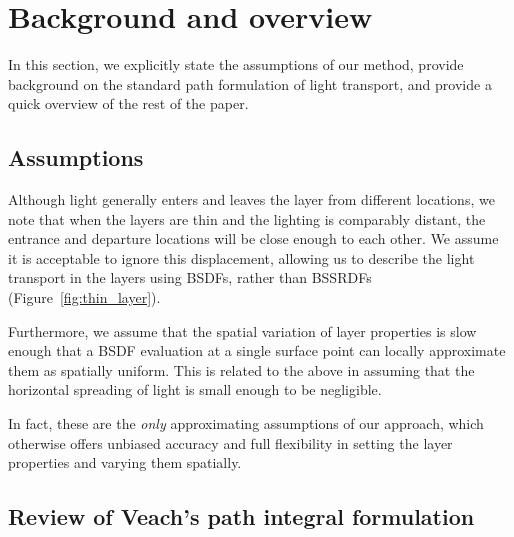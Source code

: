 \section{Background and overview}
\label{sec:background}





In this section, we explicitly state the assumptions of our method, provide background on the standard path formulation of light transport, and provide a quick overview of the rest of the paper.

\subsection{Assumptions}

Although light generally enters and leaves the layer from different locations, we note that when the layers are thin and the lighting is comparably distant, the entrance and departure locations will be close enough to each other. We assume it is acceptable to ignore this displacement, allowing us to describe the light transport in the layers using BSDFs, rather than BSSRDFs (Figure~\ref{fig:thin_layer}).

Furthermore, we assume that the spatial variation of layer properties is slow enough that a BSDF evaluation at a single surface point can locally approximate them as spatially uniform. This is related to the above in assuming that the horizontal spreading of light is small enough to be negligible.

In fact, these are the \emph{only} approximating assumptions of our approach, which otherwise offers unbiased accuracy and full flexibility in setting the layer properties and varying them spatially.

\subsection{Review of Veach's path integral formulation}
\label{subsec:path_int}

